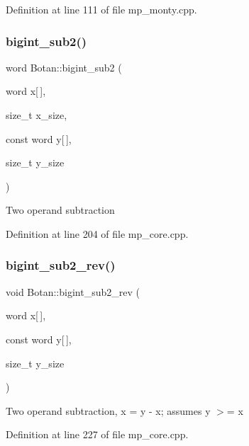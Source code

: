 Definition at line 111 of file mp\+\_\+monty.\+cpp.

\mbox{\label{namespace_botan_a1d2b962eb5d832116befc5957a6c975e}} 
\subsubsection{\texorpdfstring{bigint\+\_\+sub2()}{bigint\_sub2()}}
{\footnotesize\ttfamily word Botan\+::bigint\+\_\+sub2 (\begin{DoxyParamCaption}\item[{word}]{x\mbox{[}$\,$\mbox{]},  }\item[{size\+\_\+t}]{x\+\_\+size,  }\item[{const word}]{y\mbox{[}$\,$\mbox{]},  }\item[{size\+\_\+t}]{y\+\_\+size }\end{DoxyParamCaption})}

Two operand subtraction 

Definition at line 204 of file mp\+\_\+core.\+cpp.

\mbox{\label{namespace_botan_a108c3a5b46712583de64a39d5fa6841b}} 
\subsubsection{\texorpdfstring{bigint\+\_\+sub2\+\_\+rev()}{bigint\_sub2\_rev()}}
{\footnotesize\ttfamily void Botan\+::bigint\+\_\+sub2\+\_\+rev (\begin{DoxyParamCaption}\item[{word}]{x\mbox{[}$\,$\mbox{]},  }\item[{const word}]{y\mbox{[}$\,$\mbox{]},  }\item[{size\+\_\+t}]{y\+\_\+size }\end{DoxyParamCaption})}

Two operand subtraction, x = y -\/ x; assumes y $>$= x 

Definition at line 227 of file mp\+\_\+core.\+cpp.

\mbox{\label{namespace_botan_aecdda04dbd8f4ec5aab85af9983e9c7a}} 
